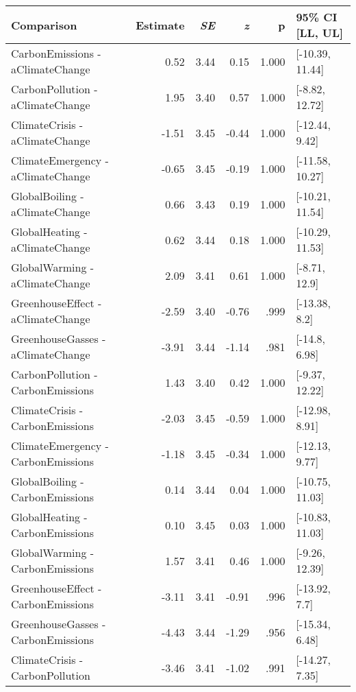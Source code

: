 \begin{table}[ht]
\centering
\begin{tabular}{lrrrrl}
  \hline
Comparison & Estimate & \textit{SE} & \textit{z} & p & 95\% CI [LL, UL] \\ 
  \hline
CarbonEmissions - aClimateChange & 0.52 & 3.44 & 0.15 & 1.000 & [-10.39, 11.44] \\ 
  CarbonPollution - aClimateChange & 1.95 & 3.40 & 0.57 & 1.000 & [-8.82, 12.72] \\ 
  ClimateCrisis - aClimateChange & -1.51 & 3.45 & -0.44 & 1.000 & [-12.44, 9.42] \\ 
  ClimateEmergency - aClimateChange & -0.65 & 3.45 & -0.19 & 1.000 & [-11.58, 10.27] \\ 
  GlobalBoiling - aClimateChange & 0.66 & 3.43 & 0.19 & 1.000 & [-10.21, 11.54] \\ 
  GlobalHeating - aClimateChange & 0.62 & 3.44 & 0.18 & 1.000 & [-10.29, 11.53] \\ 
  GlobalWarming - aClimateChange & 2.09 & 3.41 & 0.61 & 1.000 & [-8.71, 12.9] \\ 
  GreenhouseEffect - aClimateChange & -2.59 & 3.40 & -0.76 & .999 & [-13.38, 8.2] \\ 
  GreenhouseGasses - aClimateChange & -3.91 & 3.44 & -1.14 & .981 & [-14.8, 6.98] \\ 
  CarbonPollution - CarbonEmissions & 1.43 & 3.40 & 0.42 & 1.000 & [-9.37, 12.22] \\ 
  ClimateCrisis - CarbonEmissions & -2.03 & 3.45 & -0.59 & 1.000 & [-12.98, 8.91] \\ 
  ClimateEmergency - CarbonEmissions & -1.18 & 3.45 & -0.34 & 1.000 & [-12.13, 9.77] \\ 
  GlobalBoiling - CarbonEmissions & 0.14 & 3.44 & 0.04 & 1.000 & [-10.75, 11.03] \\ 
  GlobalHeating - CarbonEmissions & 0.10 & 3.45 & 0.03 & 1.000 & [-10.83, 11.03] \\ 
  GlobalWarming - CarbonEmissions & 1.57 & 3.41 & 0.46 & 1.000 & [-9.26, 12.39] \\ 
  GreenhouseEffect - CarbonEmissions & -3.11 & 3.41 & -0.91 & .996 & [-13.92, 7.7] \\ 
  GreenhouseGasses - CarbonEmissions & -4.43 & 3.44 & -1.29 & .956 & [-15.34, 6.48] \\ 
  ClimateCrisis - CarbonPollution & -3.46 & 3.41 & -1.02 & .991 & [-14.27, 7.35] \\ 

\end{tabular}
\end{table}
